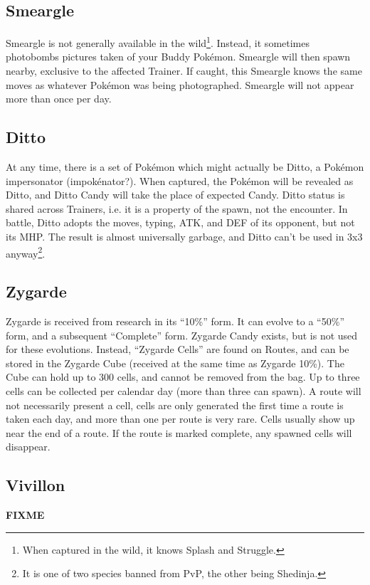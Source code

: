 \subsection{Smeargle}
\label{subsec:smeargle}
Smeargle is not generally available in the wild\footnote{When captured in the wild, it knows Splash and Struggle.}.
Instead, it sometimes photobombs pictures taken of your Buddy Pokémon.
Smeargle will then spawn nearby, exclusive to the affected Trainer.
If caught, this Smeargle knows the same moves as whatever Pokémon was being photographed.
Smeargle will not appear more than once per day.

\subsection{Ditto}
\label{subsec:ditto}
At any time, there is a set of Pokémon which might actually be Ditto,
  a Pokémon impersonator (impokénator?).
When captured, the Pokémon will be revealed as Ditto, and Ditto Candy will take
  the place of expected Candy.
Ditto status is shared across Trainers, i.e. it is a property of the spawn, not the encounter.
In battle, Ditto adopts the moves, typing, ATK, and DEF of its opponent, but not its MHP\@.
The result is almost universally garbage, and Ditto can't be used in 3x3 anyway\footnote{It is one of two species banned from PvP, the other being Shedinja.}.

\subsection{Zygarde}
\label{subsec:zygarde}
Zygarde is received from research in its ``10\%'' form.
It can evolve to a ``50\%'' form, and a subsequent ``Complete'' form.
Zygarde Candy exists, but is not used for these evolutions.
Instead, ``Zygarde Cells'' are found on Routes, and can be stored in the Zygarde Cube
 (received at the same time as Zygarde 10\%).
The Cube can hold up to 300 cells, and cannot be removed from the bag.
Up to three cells can be collected per calendar day (more than three can spawn).
A route will not necessarily present a cell, cells are only generated the first
  time a route is taken each day, and more than one per route is very rare.
Cells usually show up near the end of a route.
If the route is marked complete, any spawned cells will disappear.

\subsection{Vivillon}
\label{subsec:vivillon}
\textbf{FIXME}
